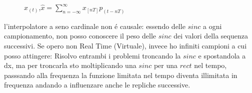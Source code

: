             \begin{figure}[H]
                \centering
                \caption{$x_{(t)}$,{\color{orange}$\hat{x} = \sum_{n=-\infty}^{\infty}x_{[nT]}p_{(t-nT)}$}}
                \label{fig:x con interpolatore a seno cardinale}
            \end{figure}
            l'interpolatore a seno cardinale non é causale: essendo delle $sinc$ a ogni campionamento, non posso conoscere il peso delle $sinc$ 
            dei valori della sequenza successivi. Se opero non Real Time (Virtuale), invece ho infiniti campioni a cui posso attingere: Risolvo entrambi i 
            problemi troncando la $sinc$ e spostandola a dx, ma per troncarla sto moltiplicando una $sinc$ per una $rect$ nel tempo, passsando alla frequenza 
            la funzione limitata nel tempo diventa illimitata in frequenza andando a influenzare anche le repliche successive.


        
